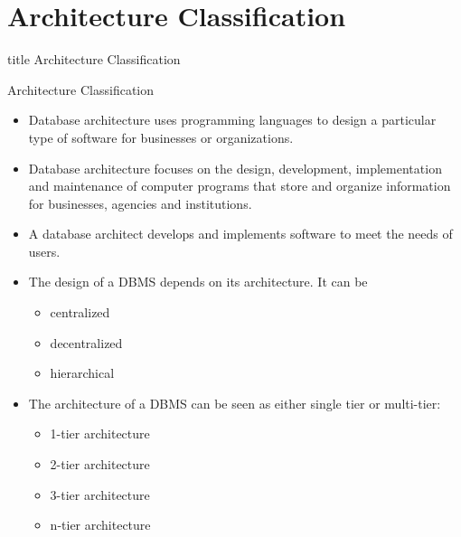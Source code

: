 \documentclass[aspectratio=169, xcolor=dvipsnames]{beamer}
\begin{document}
\section{Architecture Classification}
\begin{frame}
  \vfill
  \centering
  \begin{beamercolorbox}[sep=8pt,center,shadow=true,rounded=true]{title}
    Architecture Classification\par%
  \end{beamercolorbox}
  \vfill
\end{frame}

\begin{frame}{Architecture Classification}
    \begin{itemize}[<+->]
        \item Database architecture uses programming languages to design a particular type of software for businesses or organizations.
        \item Database architecture focuses on the design, development, implementation and maintenance of computer programs that store and organize information for businesses, agencies and institutions.
        \item A database architect develops and implements software to meet the needs of users.
        \item The design of a DBMS depends on its architecture. It can be
        \begin{itemize}
            \item[$\triangleright$] centralized
            \item[$\triangleright$] decentralized
            \item[$\triangleright$] hierarchical
        \end{itemize}
        \item The architecture of a DBMS can be seen as either single tier or multi-tier:
        \begin{itemize}
            \item[$\triangleright$] 1-tier architecture
            \item[$\triangleright$] 2-tier architecture
            \item[$\triangleright$] 3-tier architecture
            \item[$\triangleright$] n-tier architecture
        \end{itemize}
    \end{itemize}
\end{frame}
\end{document}
